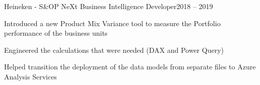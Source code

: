 \resumeSubheading
  {Heineken - S\&OP NeXt}{}
  {Business Intelligence Developer}{2018 – 2019}
  \vspace{\experienceItemSpacing}
  \resumeItemListStart
\item Introduced a new Product Mix Variance tool to measure the Portfolio performance of the business units
\item Engineered the calculations that were needed (DAX and Power Query)
\item Helped transition the deployment of the data models from separate files to Azure Analysis Services
  \resumeItemListEnd 